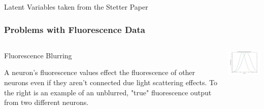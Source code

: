 \documentclass{beamer}
\begin{document}
 
 \begin{frame}{Latent Variables taken from the Stetter Paper}
\frametitle{Problems with Fluorescence Data}
 \begin{columns}[T]
    \begin{column}{.5\textwidth}
   
\begin{block}{Fluorescence Blurring}
        
	
	A neuron's fluorescence values effect the fluorescence of other neurons even if they aren't connected due light scattering effects. To the right is an example of an unblurred, "true" fluorescence output from two different neurons. 
   \end{block}





  
\end{column}
    \begin{column}{60mm}
    \begin{block}{}
    \includegraphics[width=55mm]{two_unblurred_neurons.jpg}
   
    \end{block}
    \end{column}
\end{columns} 

\end{frame}
\end{document}
